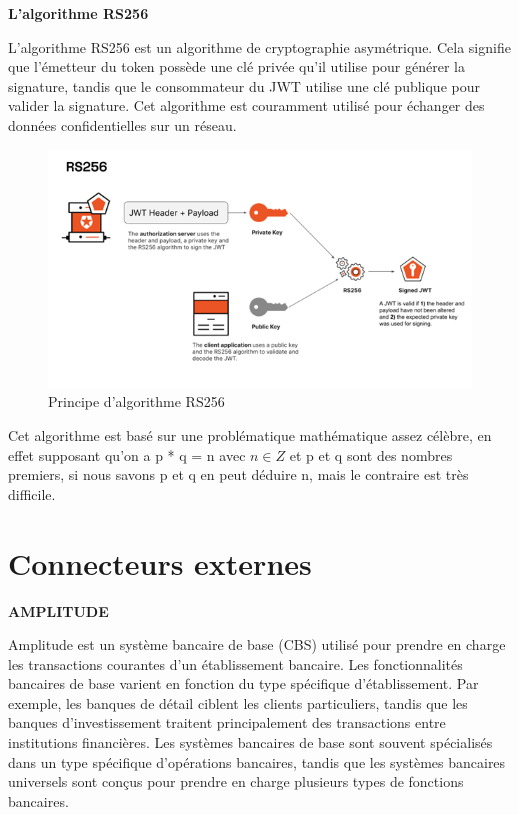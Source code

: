 \textbf{\large{L'algorithme RS256}\\}

L'algorithme RS256 est un algorithme de cryptographie asymétrique. Cela signifie que l'émetteur du token possède une clé privée qu'il utilise pour générer la signature, tandis que le consommateur du JWT utilise une clé publique pour valider la signature. Cet algorithme est couramment utilisé pour échanger des données confidentielles sur un réseau.

\begin{figure}[!h]
    \centering %
        \includegraphics[width=16cm]{images/conception/algorithme.png}
    \caption{Principe d’algorithme RS256}
\end{figure}

Cet algorithme est basé sur une problématique mathématique assez célèbre, en effet supposant qu'on a p * q = n avec $n \in Z $ et p et q sont des nombres premiers, si nous savons p et q en peut déduire n, mais le contraire est très difficile.


\section{Connecteurs externes}
\textbf{\large{AMPLITUDE}\\}

\par Amplitude est un système bancaire de base (CBS) utilisé pour prendre en charge les transactions courantes d'un établissement bancaire. Les fonctionnalités bancaires de base varient en fonction du type spécifique d'établissement. Par exemple, les banques de détail ciblent les clients particuliers, tandis que les banques d'investissement traitent principalement des transactions entre institutions financières. Les systèmes bancaires de base sont souvent spécialisés dans un type spécifique d'opérations bancaires, tandis que les systèmes bancaires universels sont conçus pour prendre en charge plusieurs types de fonctions bancaires.\\

